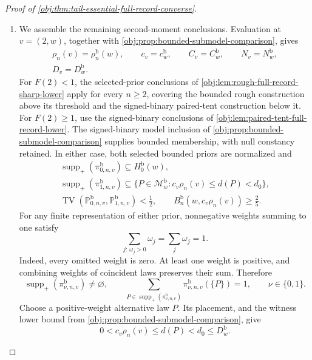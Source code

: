 \documentclass[11pt]{article}
\begin{document}
\begin{proof}[Proof of \cref{obj:thm:tail-essential-full-record-converse}]
\begin{enumerate}
\item
We assemble the remaining second-moment conclusions. Evaluation at
\(v=(2,w)\), together with
\cref{obj:prop:bounded-submodel-comparison}, gives
\[
\begin{gathered}
\rho_n(v)=\rho_n^{\mathrm b}(w),\qquad
c_v=c_w^{\mathrm b},\qquad
C_v=C_w^{\mathrm b},\qquad
N_v=N_w^{\mathrm b},\\
D_v=D_w^{\mathrm b}.
\end{gathered}
\]
For \(F(2)<1\), the selected-prior conclusions of
\cref{obj:lem:rough-full-record-sharp-lower} apply for every \(n\ge2\),
covering the bounded rough construction above its threshold and the
signed-binary paired-tent construction below it. For \(F(2)\ge1\), use
the signed-binary conclusions of
\cref{obj:lem:paired-tent-full-record-lower}. The signed-binary model
inclusion of \cref{obj:prop:bounded-submodel-comparison} supplies bounded
membership, with null constancy retained. In either case, both selected
bounded priors are normalized and
\[
\begin{gathered}
\operatorname{supp}_+(\pi^{\mathrm b}_{0,n,v})
\subseteq H_0^{\mathrm b}(w),\\
\operatorname{supp}_+(\pi^{\mathrm b}_{1,n,v})
\subseteq
\{P\in\mathcal M_w^{\mathrm b}:
c_v\rho_n(v)\le d(P)<d_0\},\\
\operatorname{TV}(\mathbb P^{\mathrm b}_{0,n,v},
                  \mathbb P^{\mathrm b}_{1,n,v})<\frac12,\qquad
B_n^{\mathrm b}(w,c_v\rho_n(v))\ge\frac25.
\end{gathered}
\]
For any finite representation of either prior, nonnegative weights
summing to one satisfy
\[
\sum_{j:\,\omega_j>0}\omega_j=\sum_j\omega_j=1.
\]
Indeed, every omitted weight is zero. At least one weight is positive,
and combining weights of coincident laws preserves their sum.
Therefore
\[
\operatorname{supp}_+(\pi^{\mathrm b}_{\nu,n,v})\ne\varnothing,
\qquad
\sum_{P\in\operatorname{supp}_+(\pi^{\mathrm b}_{\nu,n,v})}
\pi^{\mathrm b}_{\nu,n,v}(\{P\})=1,
\qquad \nu\in\{0,1\}.
\]
Choose a positive-weight alternative law \(P\). Its placement, and the
witness lower bound from
\cref{obj:prop:bounded-submodel-comparison}, give
\[
0<c_v\rho_n(v)\le d(P)<d_0\le D_w^{\mathrm b}.
\]


\end{enumerate}
\end{proof}
\end{document}
